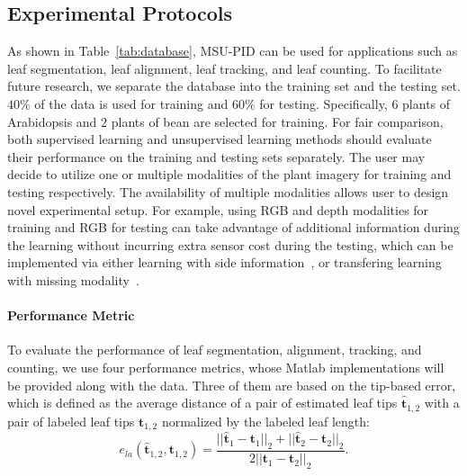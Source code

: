 \subsection{Experimental Protocols}
\label{sec:protocol}
As shown in Table~\ref{tab:database}, MSU-PID can be used for applications such as leaf segmentation, leaf alignment, leaf tracking, and leaf counting.
To facilitate future research, we separate the database into the training set and the testing set.
$40\%$ of the data is used for training and $60\%$ for testing.
Specifically, $6$ plants of Arabidopsis and $2$ plants of bean are selected for training.
For fair comparison, both supervised learning and unsupervised learning methods should evaluate their performance on the training and testing sets separately.
The user may decide to utilize one or multiple modalities of the plant imagery for training and testing respectively.
The availability of multiple modalities allows user to design novel experimental setup.
For example, using RGB and depth modalities for training and RGB for testing can take advantage of additional information during the learning without incurring extra sensor cost during the testing, which can be implemented via either learning with side information~\cite{chen2013boosting}, or transfering learning with missing modality~\cite{ding2014latent}.


\paragraph{Performance Metric}
To evaluate the performance of leaf segmentation, alignment, tracking, and counting, we use four performance metrics, whose Matlab implementations will be provided along with the data.
Three of them are based on the tip-based error, which is defined as the average distance of a pair of estimated leaf tips $\hat{\bm{t}}_{1,2}$ with a pair of labeled leaf tips $ \bm{t}_{1,2}$ normalized by the labeled leaf length:
\begin {equation}
e_{la}(\hat{\bm{t}}_{1,2}, \bm{t}_{1,2}) = \frac{||\hat{\bm{t}}_1-{\bm{t}}_1||_2 + ||\hat{\bm{t}}_2-{\bm{t}}_2||_2}{2 ||\bm{t}_1-\bm{t}_2||_2}.
\label{eqn:tipError}
\end{equation}

